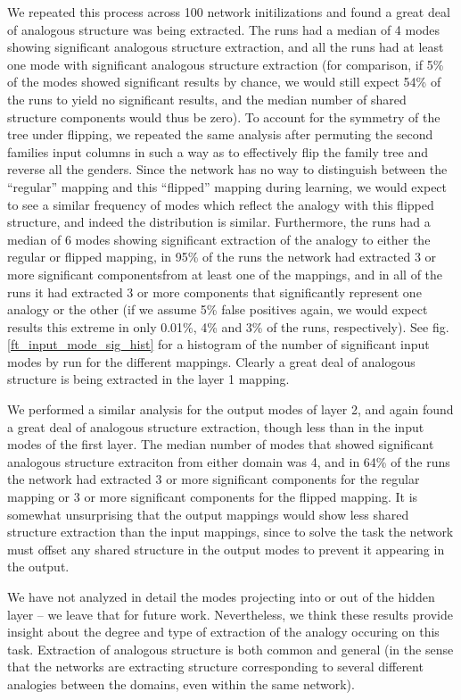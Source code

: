 \documentclass[10pt,letterpaper]{article}
\begin{document}
We repeated this process across 100 network initilizations and found a great deal of analogous structure was being extracted. The runs had a median of 4 modes showing significant analogous structure extraction, and all the runs had at least one mode with significant analogous structure extraction (for comparison, if 5\% of the modes showed significant results by chance, we would still expect 54\% of the runs to yield no significant results, and the median number of shared structure components would thus be zero). To account for the symmetry of the tree under flipping, we repeated the same analysis after permuting the second families input columns in such a way as to effectively flip the family tree and reverse all the genders. Since the network has no way to distinguish between the ``regular'' mapping and this ``flipped'' mapping during learning, we would expect to see a similar frequency of modes which reflect the analogy with this flipped structure, and indeed the distribution is similar. Furthermore, the runs had a median of 6 modes showing significant extraction of the analogy to either the regular or flipped mapping, in 95\% of the runs the network had extracted 3 or more significant componentsfrom at least one of the mappings, and in all of the runs it had extracted 3 or more components that significantly represent one analogy or the other (if we assume 5\% false positives again, we would expect results this extreme in only 0.01\%, 4\% and 3\% of the runs, respectively). See fig. \ref{ft_input_mode_sig_hist} for a histogram of the number of significant input modes by run for the different mappings. Clearly a great deal of analogous structure is being extracted in the layer 1 mapping. \par
We performed a similar analysis for the output modes of layer 2, and again found a great deal of analogous structure extraction, though less than in the input modes of the first layer. The median number of modes that showed significant analogous structure extraciton from either domain was 4, and in 64\% of the runs the network had extracted 3 or more significant components for the regular mapping or 3 or more significant components for the flipped mapping. It is somewhat unsurprising that the output mappings would show less shared structure extraction than the input mappings, since to solve the task the network must offset any shared structure in the output modes to prevent it appearing in the output. \par  
We have not analyzed in detail the modes projecting into or out of the hidden layer -- we leave that for future work. Nevertheless, we think these results provide insight about the degree and type of extraction of the analogy occuring on this task. Extraction of analogous structure is both common and general (in the sense that the networks are extracting structure corresponding to several different analogies between the domains, even within the same network).
\end{document}
